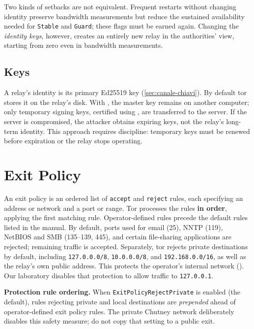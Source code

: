 Two kinds of setbacks are not equivalent. Frequent restarts without changing identity preserve bandwidth measurements but reduce the sustained availability needed for \texttt{Stable} and \texttt{Guard}; these flags must be earned again. Changing the \emph{identity keys}, however, creates an entirely new relay in the authorities' view, starting from zero even in bandwidth measurements.

\subsection{Keys}

A relay's identity is its primary Ed25519 key (\cref{sec:canale-chiavi}). By default tor stores it on the relay's disk. With , the master key remains on another computer; only temporary signing keys, certified using , are transferred to the server. If the server is compromised, the attacker obtains expiring keys, not the relay's long-term identity. This approach requires discipline: temporary keys must be renewed before expiration or the relay stops operating.

\section{Exit Policy}\label{sec:relay-exitpolicy}

An exit policy is an ordered list of \texttt{accept} and \texttt{reject} rules, each specifying an address or network and a port or range. Tor processes the rules \textbf{in order}, applying the first matching rule. Operator-defined rules precede the default rules listed in the manual. By default, ports used for email (25), NNTP (119), NetBIOS and SMB (135--139, 445), and certain file-sharing applications are rejected; remaining traffic is accepted. Separately, tor rejects private destinations by default, including \texttt{127.0.0.0/8}, \texttt{10.0.0.0/8}, and \texttt{192.168.0.0/16}, as well as the relay's own public address. This protects the operator's internal network (). Our laboratory disables that protection to allow traffic to \texttt{127.0.0.1}.

\textbf{Protection rule ordering.} When \texttt{ExitPolicyRejectPrivate} is enabled (the default), rules rejecting private and local destinations are \emph{prepended} ahead of operator-defined exit policy rules. The private Chutney network deliberately disables this safety measure; do not copy that setting to a public exit.

